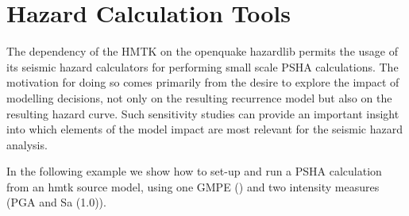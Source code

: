 \section{Hazard Calculation Tools}

The dependency of the HMTK on the openquake hazardlib permits the usage of its seismic hazard calculators for performing small scale PSHA calculations. The motivation for doing so comes primarily from the desire to explore the impact of modelling decisions, not only on the resulting recurrence model but also on the resulting hazard curve. Such sensitivity studies can provide an important insight into which elements of the model impact are most relevant for the seismic hazard analysis.

In the following example we show how to set-up and run a PSHA calculation from an hmtk source model, using one GMPE (\cite{akkar2010}) and two intensity measures (PGA and Sa (1.0)). 

